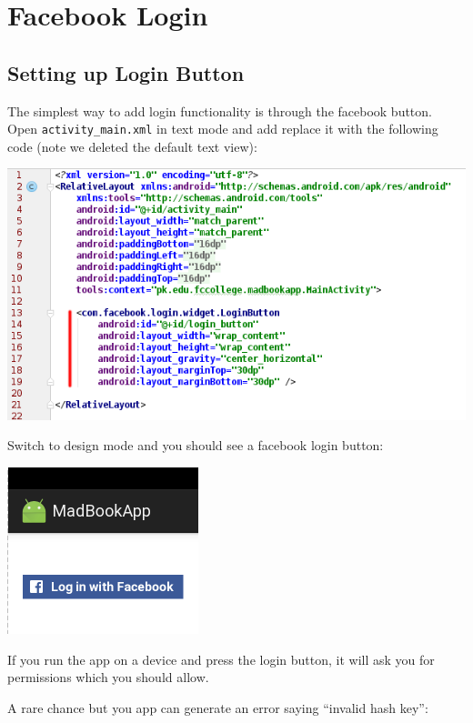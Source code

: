 \section{Facebook Login}

\subsection{Setting up Login Button}
The simplest way to add login functionality is through the facebook button. Open \texttt{activity\_main.xml} in text mode and add replace it with the following code (note we deleted the default text view):

\begin{center}
	\includegraphics[scale=\SourceCodeScale]{chapters/ch12/images/20}
\end{center}

Switch to design mode and you should see a facebook login button:

\begin{center}
	\includegraphics[scale=\SourceCodeScale]{chapters/ch12/images/21}
\end{center}

If you run the app on a device and press the login button, it will ask you for permissions which you should allow. 

A rare chance but you app can generate an error saying ``invalid hash key'':

